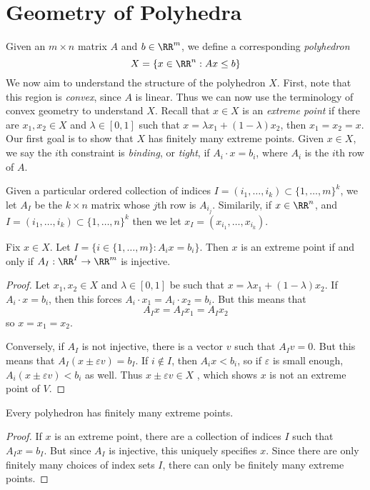 \chapter{Geometry of Polyhedra}

Given an $m \times n$ matrix $A$ and $b \in \RR^m$, we define a corresponding \emph{polyhedron}
%
\[ X = \{ x \in \RR^n: Ax \leq b \} \]
%
We now aim to understand the structure of the polyhedron $X$. First, note that this region is \emph{convex}, since $A$ is linear. Thus we can now use the terminology of convex geometry to understand $X$. Recall that $x \in X$ is an \emph{extreme point} if there are $x_1, x_2 \in X$ and $\lambda \in [0,1]$ such that $x = \lambda x_1 + (1 - \lambda) x_2$, then $x_1 = x_2 = x$. Our first goal is to show that $X$ has finitely many extreme points. Given $x \in X$, we say the $i$th constraint is \emph{binding}, or \emph{tight}, if $A_i \cdot x = b_i$, where $A_i$ is the $i$th row of $A$.

Given a particular ordered collection of indices $I = (i_1, \dots, i_k) \subset \{ 1, \dots, m \}^k$, we let $A_I$ be the $k \times n$ matrix whose $j$th row is $A_{i_j}$. Similarily, if $x \in \RR^n$, and $I = (i_1, \dots, i_k) \subset \{ 1, \dots, n \}^k$ then we let $x_I = (x_{i_1}, \dots, x_{i_k})$.

\begin{lemma} \label{bindinglemma}
    Fix $x \in X$. Let $I = \{ i \in \{ 1, \dots, m \} : A_i x = b_i \}$. Then $x$ is an extreme point if and only if $A_I: \RR^I \to \RR^m$ is injective.
\end{lemma}
\begin{proof}
    Let $x_1, x_2 \in X$ and $\lambda \in [0,1]$ be such that $x = \lambda x_1 + (1 - \lambda) x_2$. If $A_i \cdot x = b_i$, then this forces $A_i \cdot x_1 = A_i \cdot x_2 = b_i$. But this means that
    \[ A_I x = A_I x_1 = A_I x_2 \]
    so $x = x_1 = x_2$.

    Conversely, if $A_I$ is not injective, there  is a vector $v$ such that $A_I v = 0$. But this means that $A_I (x \pm \varepsilon v) = b_I$. If $i \not \in I$, then $A_i x < b_i$, so if $\varepsilon$ is small enough, $A_i (x \pm \varepsilon v) < b_i$ as well. Thus $x \pm \varepsilon v \in X$ , which shows $x$ is not an extreme point of $V$. 
\end{proof}

\begin{corollary}
    Every polyhedron has finitely many extreme points.
\end{corollary}
\begin{proof}
    If $x$ is an extreme point, there are a collection of indices $I$ such that $A_I x = b_I$. But since $A_I$ is injective, this uniquely specifies $x$. Since there are only finitely many choices of index sets $I$, there can only be finitely many extreme points.
\end{proof}

